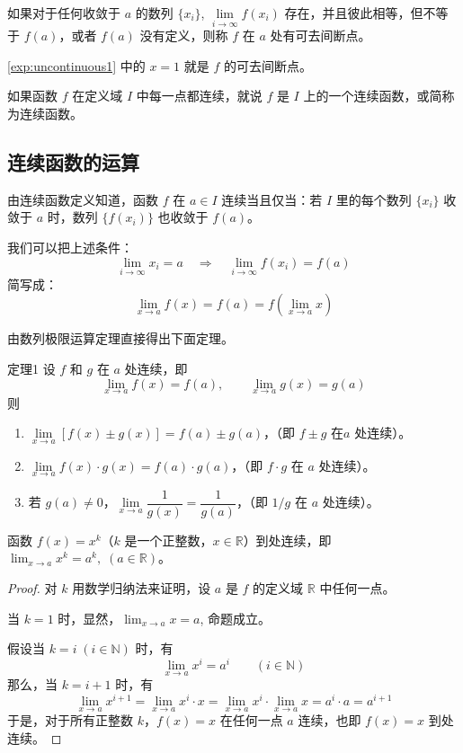 \begin{Definition}
如果对于任何收敛于 $a$ 的数列 $\{x_i\}$, $\lim\limits_{i\to\infty}f(x_i)$ 存在，并且彼此相等，但不等于 $f(a)$，或者 $f(a)$ 没有定义，则称 $f$ 在 $a$ 处有可去间断点。
\end{Definition}

\cref{exp:uncontinuous1} 中的 $x=1$ 就是 $f$ 的可去间断点。

\begin{Definition}
  如果函数 $f$ 在定义域 $I$ 中每一点都连续，就说 $f$ 是 $I$ 上的一个连续函数，或简称为连续函数。
\end{Definition}

\subsection{连续函数的运算}
由连续函数定义知道，函数 $f$ 在 $a\in I$ 连续当且仅当：若 $I$ 里的每个数列 $\{x_i\}$ 收敛于 $a$ 时，数列 $\{f(x_i)\}$ 也收敛于 $f(a)$。

我们可以把上述条件：
\[\lim_{i\to \infty}x_i=a \quad \Longrightarrow\quad \lim_{i\to \infty}f(x_i)=f(a)\]
简写成：
\[\lim_{x\to a}f(x)=f(a)=f\left(\lim_{x\to a}x\right)\]

由数列极限运算定理直接得出下面定理。

\begin{Theorem}{定理1}
  设 $f$ 和 $g$ 在 $a$ 处连续，即
  \[\lim_{x\to a}f(x)=f(a),\qquad \lim_{x\to a}g(x)=g(a)\]
  则
\begin{enumerate}[itemsep=5pt]
    \item $\lim\limits_{x\to a}[f(x)\pm g(x)]=f(a)\pm g(a)$，（即 $f\pm g$ 在$a$ 处连续）。
    \item $\lim\limits_{x\to a}f(x)\cdot g(x)=f(a)\cdot g(a)$，（即 $f\cdot g$ 在 $a$ 处连续）。
    \item 若 $g(a)\ne 0$，$\lim\limits_{x\to a}\dfrac{1}{g(x)}=\dfrac{1}{g(a)}$，（即 $1/g$ 在 $a$ 处连续）。
\end{enumerate}
\end{Theorem}

\begin{example}
  函数 $f(x)=x^k$（$k$ 是一个正整数，$x\in\mathbb{R}$）到处连续，即 $\lim_{x\to a}x^k=a^k,\; (a\in\mathbb{R})$。
\end{example}

\begin{proof}
对 $k$ 用数学归纳法来证明，设 $a$ 是 $f$ 的定义域 $\mathbb{R}$ 中任何一点。

当 $k=1$ 时，显然，$\lim_{x\to a}x=a$, 命题成立。

假设当 $k=i\; (i\in\mathbb{N})$ 时，有
\[\lim_{x\to a} x^i=a^i\qquad (i\in\mathbb{N})\]
那么，当 $k=i+1$ 时，有
\[\lim_{x\to a}x^{i+1}=\lim_{x\to a} x^i\cdot x=\lim_{x\to a} x^i\cdot \lim_{x\to a} x=a^i\cdot a=a^{i+1}\]    
于是，对于所有正整数 $k$，$f(x)=x$ 在任何一点 $a$ 连续，也即 $f(x)=x$ 到处连续。
\end{proof}


